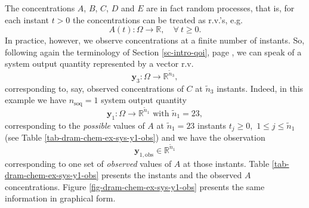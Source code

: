 The concentrations $A$, $B$, $C$, $D$ and $E$ are in fact random processes, that is, for each instant $t>0$ the concentrations can be treated as r.v.'s, e.g.
\begin{equation*}
A(t):\Omega\rightarrow\mathbb{R},\quad\forall~t\geqslant 0.
\end{equation*}
In practice, however, we observe concentrations at a finite number of instants.
So, following again the terminology of Section \ref{sc-intro-qoi}, page \pageref{sc-intro-qoi}, we can speak of a system output quantity
represented by a vector r.v. 
\begin{equation*}
\mathbf{y}_3:\Omega\rightarrow\mathbb{R}^{{\tilde{n}}_3},
\end{equation*}
corresponding to, say, observed concentrations of $C$ at ${\tilde{n}}_3$ instants.
Indeed, in this example we have
$n_{\text{soq}}=1$ system output quantity
\begin{equation*}
\mathbf{y}_1:\Omega\rightarrow\mathbb{R}^{{\tilde{n}}_1}\text{ with }{\tilde{n}}_1=23,
\end{equation*}
corresponding to the {\it possible} values of $A$ at ${\tilde{n}}_1=23$ instants $t_j\geqslant 0$,~$1\leqslant j\leqslant {\tilde{n}}_1$ (see Table \ref{tab-dram-chem-ex-sys-y1-obs})
and we have the observation 
\begin{equation*}
\mathbf{y}_{1,\text{obs}}\in\mathbb{R}^{{\tilde{n}}_1}
\end{equation*}
corresponding to one set of {\it observed} values of $A$ at those instants.
Table \ref{tab-dram-chem-ex-sys-y1-obs} presents the instants and the observed $A$ concentrations.
Figure \ref{fig-dram-chem-ex-sys-y1-obs} presents the same information in graphical form.

